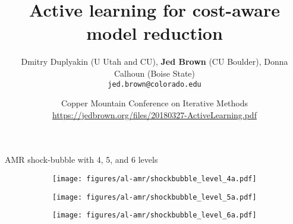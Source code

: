 \documentclass{beamer}
\title{Active learning for cost-aware model reduction}
\author{Dmitry Duplyakin (U Utah and CU), {\bf Jed Brown} (CU Boulder), Donna Calhoun (Boise State) \\
  \texttt{jed.brown@colorado.edu}}
\date{Copper Mountain Conference on Iterative Methods \\
  {\small \url{https://jedbrown.org/files/20180327-ActiveLearning.pdf}}}
\begin{document}
\lstset{language=C}
\normalem

\begin{frame}
  \titlepage
\end{frame}

\begin{frame}{AMR shock-bubble with 4, 5, and 6 levels}
  \begin{figure}
    \centering
    \begin{subfigure}[b]{0.9\columnwidth}
      \texttt{[image: figures/al-amr/shockbubble\_level\_4a.pdf]}
    \end{subfigure}
    \begin{subfigure}[b]{0.9\columnwidth}
      \texttt{[image: figures/al-amr/shockbubble\_level\_5a.pdf]}
    \end{subfigure}
    \centering 
    \begin{subfigure}[b]{0.9\columnwidth}
      \texttt{[image: figures/al-amr/shockbubble\_level\_6a.pdf]}
    \end{subfigure}
    \label{fig:shockbubble}
  \end{figure}
\end{frame}
\end{document}
